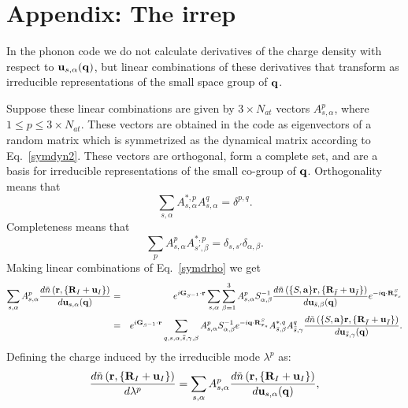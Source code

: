 \documentclass[12pt,a4paper,twoside]{report}
\begin{document}
\section{Appendix: The irrep}
In the phonon code we do not calculate derivatives of the charge density with respect to 
${\bf u}_{s,\alpha}({\bf q})$, but linear combinations of these derivatives that transform as irreducible representations of the small space group of ${\bf q}$. 

Suppose these linear combinations are given by $3\times N_{at}$ vectors $A^{p}_{s,\alpha}$, where
$1\le p \le 3 \times N_{at}$. These vectors are obtained in the code as eigenvectors of a random matrix which is symmetrized as the dynamical matrix according to Eq.~\ref{symdyn2}. These vectors are orthogonal, form a complete set, and are a basis for irreducible representations of the small co-group of ${\bf q}$.
Orthogonality means that
\begin{equation}
\sum_{s,\alpha} A^{*,p}_{s,\alpha} A^{q}_{s,\alpha}=\delta^{p,q}.
\end{equation}
Completeness means that
\begin{equation}
\sum_{p} A^{p}_{s,\alpha} A^{*,p}_{s',\beta}=\delta_{s,s'} \delta_{\alpha,\beta}.
\end{equation}
Making linear combinations of Eq.~\ref{symdrho}
we get
\begin{eqnarray}
\sum_{s,\alpha} A^p_{s,\alpha} {d \tilde n\left({\bf r}, \{{\bf R}_I + {\bf u}_I\}\right)
\over d {\bf u}_{s,\alpha}({\bf q})} 
&=& e^{i{\bf G}_{S^{-1}} \cdot {\bf r}}
\sum_{s,\alpha}
\sum_{\beta=1}^3 A^p_{s,\alpha} S^{-1}_{\alpha,\beta} {d \tilde n\left(\{S,{\bf a}\} {\bf r}, \{{\bf R}_{\bar I} + {\bf u}_{\bar I}\}\right)
\over d {\bf u}_{\bar s,\beta} ({\bf q})} e^{-i{\bf q}\cdot {\bf R}^S_{{\boldsymbol{\tau}_s}}}\nonumber \\
&=& e^{i{\bf G}_{S^{-1}} \cdot {\bf r}}
\sum_{q,s,\alpha, \bar{\bar s},\gamma,\beta} A^p_{s,\alpha} S^{-1}_{\alpha,\beta} e^{-i{\bf q}\cdot {\bf R}^S_{{\boldsymbol{\tau}_s}}} A^{*,q}_{\bar s,\beta} A^q_{\bar {\bar s},\gamma} {d \tilde n\left(\{S,{\bf a}\} {\bf r}, \{{\bf R}_{\bar I} + {\bf u}_{\bar I}\}\right)
\over d {\bf u}_{\bar {\bar s},\gamma} ({\bf q})}. \nonumber \\
\label{symdrhop}
\end{eqnarray}
Defining the charge induced by the irreducible mode $\lambda^p$ as:
\begin{equation}
{d \tilde n\left({\bf r}, \{{\bf R}_I + {\bf u}_I\}\right)
\over d \lambda^p}=
\sum_{s,\alpha} A^p_{s,\alpha} {d \tilde n\left({\bf r}, \{{\bf R}_I + {\bf u}_I\}\right)
\over d {\bf u}_{s,\alpha}({\bf q})},
\end{equation}
\end{document}
